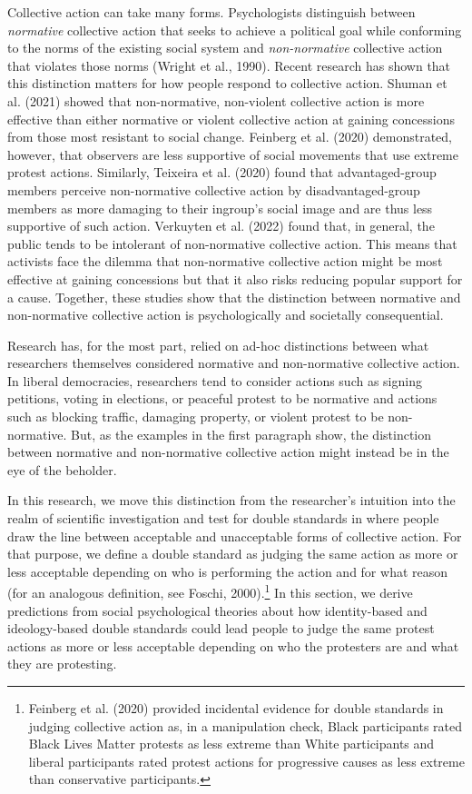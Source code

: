 \documentclass[twocolumn, 11pt, letterpaper]{article}
\begin{document}
Collective action can take many forms. Psychologists distinguish between
\emph{normative} collective action that seeks to achieve a political
goal while conforming to the norms of the existing social system and
\emph{non-normative} collective action that violates those norms (Wright
et al., 1990). Recent research has shown that this distinction matters
for how people respond to collective action. Shuman et al. (2021) showed
that non-normative, non-violent collective action is more effective than
either normative or violent collective action at gaining concessions
from those most resistant to social change. Feinberg et al. (2020)
demonstrated, however, that observers are less supportive of social
movements that use extreme protest actions. Similarly, Teixeira et al.
(2020) found that advantaged-group members perceive non-normative
collective action by disadvantaged-group members as more damaging to
their ingroup's social image and are thus less supportive of such
action. Verkuyten et al. (2022) found that, in general, the public tends
to be intolerant of non-normative collective action. This means that
activists face the dilemma that non-normative collective action might be
most effective at gaining concessions but that it also risks reducing
popular support for a cause. Together, these studies show that the
distinction between normative and non-normative collective action is
psychologically and societally consequential.

Research has, for the most part, relied on ad-hoc distinctions between
what researchers themselves considered normative and non-normative
collective action. In liberal democracies, researchers tend to consider
actions such as signing petitions, voting in elections, or peaceful
protest to be normative and actions such as blocking traffic, damaging
property, or violent protest to be non-normative. But, as the examples
in the first paragraph show, the distinction between normative and
non-normative collective action might instead be in the eye of the
beholder.

In this research, we move this distinction from the researcher's
intuition into the realm of scientific investigation and test for double
standards in where people draw the line between acceptable and
unacceptable forms of collective action. For that purpose, we define a
double standard as judging the same action as more or less acceptable
depending on who is performing the action and for what reason (for an
analogous definition, see Foschi, 2000).\footnote{Feinberg et al. (2020)
  provided incidental evidence for double standards in judging
  collective action as, in a manipulation check, Black participants
  rated Black Lives Matter protests as less extreme than White
  participants and liberal participants rated protest actions for
  progressive causes as less extreme than conservative participants.} In
this section, we derive predictions from social psychological theories
about how identity-based and ideology-based double standards could lead
people to judge the same protest actions as more or less acceptable
depending on who the protesters are and what they are protesting.
\end{document}

